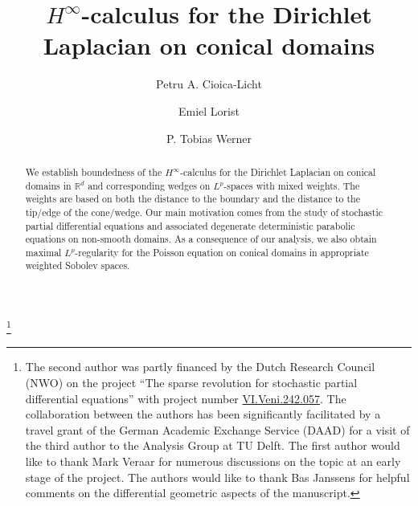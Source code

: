\documentclass[12pt,a4paper, reqno]{amsart}
\theoremstyle{plain}
\theoremstyle{definition}
\theoremstyle{remark}
\numberwithin{equation}{section}
\newcommand{\1}{\mathbbm{1}}
\newcommand{\R}{\ensuremath{\mathbb{R}}}
\newcommand{\changefont}[3]{\fontfamily{#1}\fontseries{#2}\fontshape{#3}\selectfont}
\begin{document}
\title{$H^\infty$-calculus for the Dirichlet Laplacian on conical domains}

\author[P. Cioica-Licht]{Petru A. Cioica-Licht}
\address[Petru A. Cioica-Licht]{Institute  of Mathematics \\ University of Kassel \\ Heinrich-Plett Str. 40 \\ 34132 Kassel, Germany }
\author[E. Lorist]{Emiel Lorist}
\address[Emiel Lorist]{Delft Institute of Applied Mathematics\\
Delft University of Technology \\ P.O. Box 5031\\ 2600 GA Delft\\The
Netherlands} 

\author[P.T. Werner]{P. Tobias Werner}
\address[P. Tobias Werner]{Institute  of Mathematics \\ University of Kassel \\ Heinrich-Plett Str. 40 \\ 34132 Kassel, Germany } 

\thanks{The second author was partly financed by the Dutch Research Council (NWO) on the project ``The sparse revolution for stochastic partial differential equations'' with project number \href{https://doi.org/10.61686/ZGRMR99948}{VI.Veni.242.057}. 
The collaboration between the authors has been significantly facilitated by a travel grant of the German Academic Exchange Service (DAAD) for a  visit of the third author to the Analysis Group at TU Delft. 
The first author would like to thank Mark Veraar for numerous discussions on the topic at an early stage of the project. The authors would like to thank Bas Janssens for helpful comments on the differential geometric aspects of the manuscript.}



\changefont{ptm}{m}{n} %


\begin{abstract}
\noindent 
We establish boundedness of the $H^\infty$-calculus for the Dirichlet Laplacian on conical domains in $\R^d$ and corresponding wedges on $L^p$-spaces with mixed weights.
The weights are based on both the distance to the boundary and the distance to the tip/edge of the cone/wedge.
Our main motivation comes from the study of stochastic partial differential equations and associated degenerate deterministic parabolic equations on non-smooth domains.
As a consequence of our analysis, we also obtain maximal $L^p$-regularity for the Poisson equation on conical domains in appropriate weighted Sobolev spaces.
\end{abstract}
\end{document}
